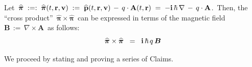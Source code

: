 \vskip 0.5cm
\begin{lemma}\label{PiCrossPi}
\mbox{}
\vskip 0.1cm
\noindent
Let
\,$
\boldsymbol{\widehat{\pi}}
\; :=: \;
    \boldsymbol{\widehat{\pi}}(t, \mathbf{r}, \mathbf{v})
\; := \;
    \widehat{\mathbf{p}}(t,\mathbf{r},\mathbf{v})
    \, \overset{{\color{white}.}}{-} \,
    q\cdot\mathbf{A}(t,\mathbf{r})
\; = \;
    -\i\,\hbar\,\nabla
    \, - \,
    q \cdot \mathbf{A}
$.\,
Then, the ``cross product''
\,$
\boldsymbol{\widehat{\pi}} \times \boldsymbol{\widehat{\pi}}
$\,
can be expressed in terms of the magnetic field
\,$\mathbf{B} \, := \, \nabla \times \mathbf{A}$\,
as follows:
\begin{equation*}
\boldsymbol{\widehat{\pi}} \times \boldsymbol{\widehat{\pi}}
\;\; = \;\;
    \mathbf{i}\,\hbar\,q\,\boldsymbol{B}
\end{equation*}
\end{lemma}
\proof
We proceed by stating and proving a series of Claims.

